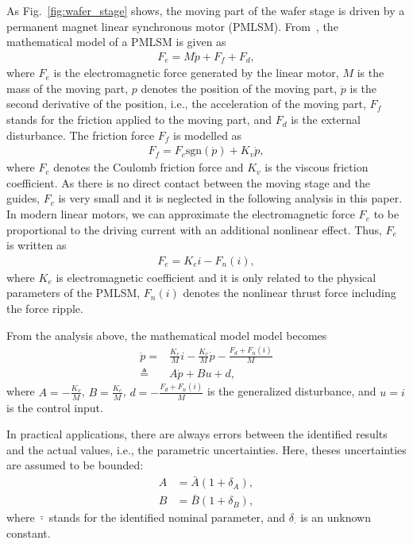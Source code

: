 \documentclass{ifacconf}
\begin{document}
As Fig.~\ref{fig:wafer_stage} shows, the moving part of the wafer stage is driven by a permanent magnet linear synchronous motor (PMLSM).   
From~\cite{chen2019precision}, the mathematical model of a PMLSM is given as
\begin{align}
    F_e=M\ddot{p}+F_f+F_d,
\end{align}
where $F_e$ is the electromagnetic force generated by the linear motor, $M$ is the mass of the moving part, $p$ denotes the position of the moving part, $\ddot{p}$ is the second derivative of the position, i.e., the acceleration of the moving part, $F_f$ stands for the friction applied to the moving part, and $F_d$ is the external disturbance. The friction force $F_f$ is modelled as
\begin{align}
    F_f=F_c \textrm{sgn}(\dot{p})+K_v \dot{p},
\end{align}
where $F_c$ denotes the Coulomb friction force and $K_v$ is the viscous friction coefficient. As there is no direct contact between the moving stage and the guides, $F_c$ is very small and it is neglected in the following analysis in this paper. In modern linear motors, we can approximate the electromagnetic force $F_e$ to be proportional to the driving current with an additional nonlinear effect. Thus, $F_e$ is written as
\begin{align}
    F_e=K_e i-F_n(i),
\end{align}
where $K_e$ is electromagnetic coefficient and it is only related to the physical parameters of the PMLSM, $F_n(i)$ denotes the nonlinear thrust force including the force ripple.

From the analysis above, the mathematical model model becomes
\begin{align} \label{model:natural}
    \ddot{p}=& \frac{K_e}{M}i-\frac{K_v}{M}\dot{p}-\frac{F_d+F_n(i)}{M} \nonumber
    \\
    \triangleq&A\dot{p} +B u +d,
\end{align}
where $A=- \frac{K_v}{M}$, $B=\frac{K_e}{M}$, $d=-\frac{F_d+F_n(i)}{M}$ is the generalized disturbance, and $u=i$ is the control input.

In practical applications,  there are always errors between the identified results and the actual values, i.e., the parametric uncertainties. Here, theses uncertainties are assumed to be bounded:
\begin{align}
    A&=\bar{A}(1+\delta_{A}),\\
    B&=\bar{B}(1+\delta_B),
\end{align}
where $\bar{\cdot}$ stands for the identified nominal parameter, and $\delta_{\cdot}$ is an unknown constant.
\end{document}
